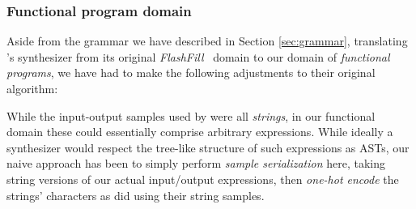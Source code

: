 \documentclass{article}
\begin{document}




\subsubsection{Functional program domain} \label{sec:fp}

Aside from the grammar we have described in Section \ref{sec:grammar},
translating \citet{nsps}'s synthesizer from its original \emph{FlashFill}~\citep{prose} domain to our domain of \emph{functional programs},
we have had to make the following adjustments to their original algorithm:

    While the input-output samples used by \citet{nsps} were all \emph{strings},
    in our functional domain these could essentially comprise arbitrary expressions.
    While ideally a synthesizer would respect the tree-like structure of such expressions as ASTs,
    our naive approach has been to simply perform \emph{sample serialization} here,
    taking string versions of our actual input/output expressions,
    then \emph{one-hot encode} the strings' characters as \citet{nsps} did using their string samples.
\end{document}

